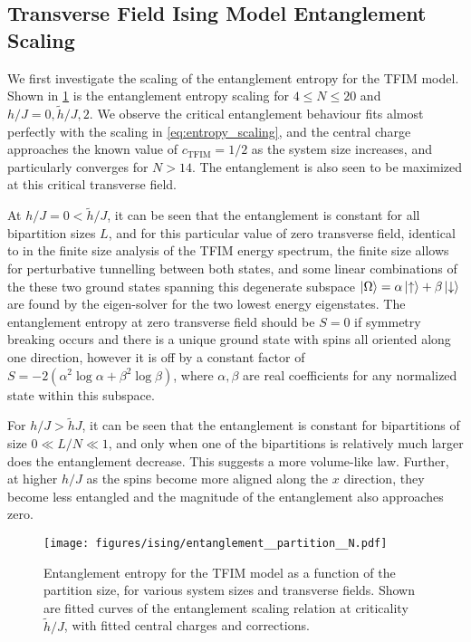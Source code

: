 \documentclass[12pt]{article}{}
\begin{document}
\subsection{Transverse Field Ising Model Entanglement Scaling}
We first investigate the scaling of the entanglement entropy for the TFIM model. Shown in \cref{fig:ising_entanglement_partition} is the entanglement entropy scaling for $4 \leq N \leq 20$ and $h/J = 0,\tilde{h}/J,2$. We observe the critical entanglement behaviour fits almost perfectly with the scaling in \cref{eq:entropy_scaling}, and the central charge approaches the known value \cite{Cole2017} of $\boxed{c_{\textrm{TFIM}} = 1/2}$ as the system size increases, and particularly converges for $N>14$. The entanglement is also seen to be maximized at this critical transverse field.

At $h/J = 0 < \tilde{h}/J$, it can be seen that the entanglement is constant for all bipartition sizes $L$, and for this particular value of zero transverse field, identical to in the finite size analysis of the TFIM energy spectrum, the finite size allows for perturbative tunnelling between both states, and some linear combinations of the these two ground states spanning this degenerate subspace $\ket{\Omega} = \alpha \ket{\uparrow} + \beta \ket{\downarrow}$ are found by the eigen-solver for the two lowest energy eigenstates. The entanglement entropy at zero transverse field should be $S = 0$ if symmetry breaking occurs and there is a unique ground state with spins all oriented along one direction, however it is off by a constant factor of $S = -2(\alpha^2\log\alpha + \beta^2\log\beta)$, where $\alpha,\beta$ are real coefficients for any normalized state within this subspace.

For $h/J > \tilde{h}{J}$, it can be seen that the entanglement is constant for bipartitions of size $0 \ll L/N \ll 1$, and only when one of the bipartitions is relatively much larger does the entanglement decrease. This suggests a more volume-like law. Further, at higher $h/J$ as the spins become more aligned along the $x$ direction, they become less entangled and the magnitude of the entanglement also approaches zero.

\begin{figure}[H]
  \centering
  \texttt{[image: figures/ising/entanglement\_\_partition\_\_N.pdf]}
  \caption{Entanglement entropy for the TFIM model as a function of the partition size, for various system sizes and transverse fields. Shown are fitted curves of the entanglement scaling relation at criticality $\tilde{h}/J$, with fitted central charges and corrections.}
  \label{fig:ising_entanglement_partition}
\end{figure}
\end{document}
